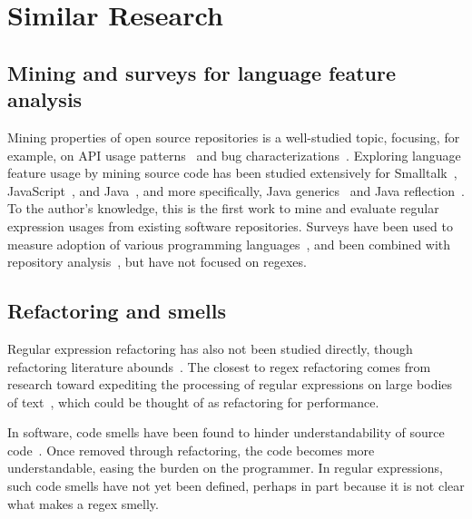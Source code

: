 \section{Similar Research}

\subsection{Mining and surveys for language feature analysis}
Mining properties of open source repositories is a well-studied topic, focusing, for example, on API usage patterns~ and bug characterizations~.
Exploring language feature usage by mining source code has been studied extensively for
Smalltalk~,
JavaScript~,
and Java~,
and more specifically,
Java generics~ and
Java reflection~.
To the author's knowledge, this is the first work to mine and evaluate regular expression usages from existing software repositories.
Surveys have been used to measure adoption of various programming languages~, and been combined with  repository analysis~, but have not focused on regexes.

\subsection{Refactoring and smells}
Regular expression refactoring has also not been studied directly, though refactoring literature abounds~.
The closest to regex refactoring comes from research toward  expediting the processing of regular expressions on large bodies of text~, which could be thought of as refactoring for performance.

In software, code smells have been found to hinder understandability of source code~.
Once removed through refactoring, the code becomes more understandable, easing the burden on the programmer.
In regular expressions, such code smells have not yet been defined, perhaps in part because it is not clear what makes a regex smelly.

